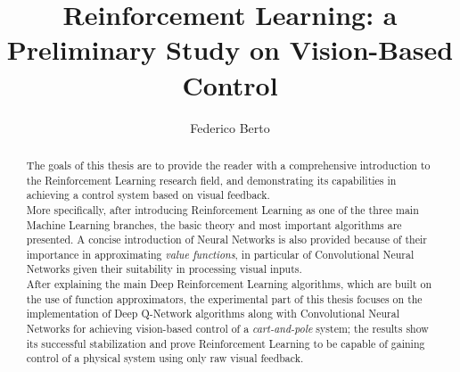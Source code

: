 \documentclass[a4paper, 12pt]{report}
\begin{document}
	
\title{Reinforcement Learning: a Preliminary Study on Vision-Based Control}
\author{Federico Berto}






\begin{abstract}
	The goals of this thesis are to provide the reader with a comprehensive introduction to the Reinforcement Learning research field, and demonstrating its capabilities in achieving a control system based on visual feedback.
	\\
	\indent More specifically, after introducing Reinforcement Learning as one of the three main Machine Learning branches, the basic theory and most important algorithms are presented. A concise introduction of Neural Networks is also provided because of their importance in approximating \textit{value functions}, in particular of Convolutional Neural Networks given their suitability in processing visual inputs.
	\\
	\indent After explaining the main Deep Reinforcement Learning algorithms, which are built on the use of function approximators, the experimental part of this thesis focuses on the implementation of Deep Q-Network algorithms along with Convolutional Neural Networks for  achieving vision-based control of a \textit{cart-and-pole} system; the results show its successful stabilization and prove Reinforcement Learning to be capable of gaining control of a physical system using only raw visual feedback.

\end{abstract}
\end{document}

